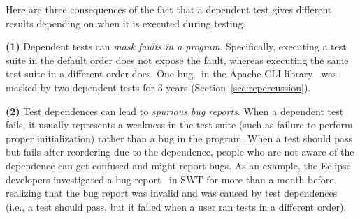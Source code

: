 %
%




Here are three consequences of the fact that a dependent
test gives different results depending on when it is executed
during testing.

\textbf{(1)}
Dependent tests can
\emph{mask faults in a program}. Specifically, executing a test suite in the
default order does not expose the fault, whereas
executing the same test suite in a different order does. 
One bug~\cite{clibug} in the Apache CLI library~\cite{cli}
was masked by two dependent tests
for 3 years (Section~\ref{sec:repercussion}).

\textbf{(2)}
Test dependences can lead to \emph{spurious bug reports}.
When a dependent test fails, it usually represents
a weakness in the test
suite (such as failure to perform proper initialization) rather than a bug
in the program. 
When a test should pass but
fails after reordering due to the dependence,
people who are not aware of the dependence can get confused
and might report bugs.
%
As an example, the Eclipse developers
investigated a bug report~\cite{eclipsebug} in SWT for
more than a month before realizing that the 
bug report was invalid and was caused by test dependences
(i.e., a test should pass, but it failed when a user
ran tests in a different order).
%



